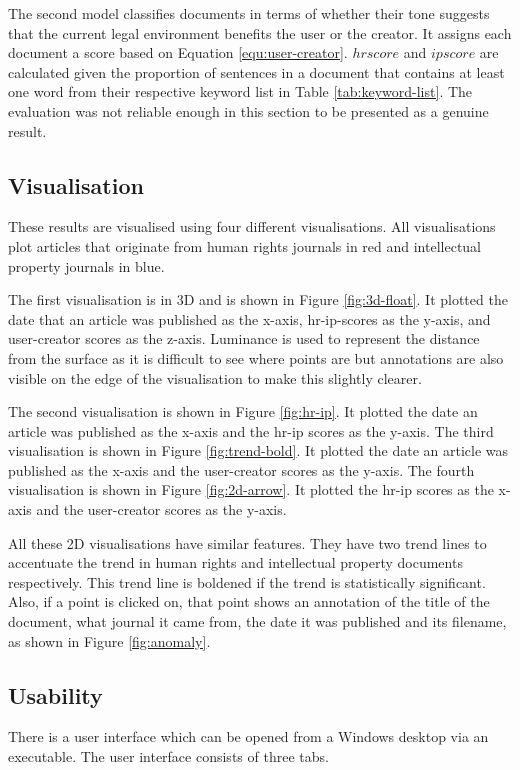 			The second model classifies documents in terms of whether their tone suggests that the current legal environment benefits the user or the creator. It assigns each document a score based on Equation \ref{equ:user-creator}. $hrscore$ and $ipscore$ are calculated given the proportion of sentences in a document that contains at least one word from their respective keyword list in Table \ref{tab:keyword-list}. The evaluation was not reliable enough in this section to be presented as a genuine result.  
		\subsection{Visualisation}
			These results are visualised using four different visualisations. All visualisations plot articles that originate from human rights journals in red and intellectual property journals in blue.  

			The first visualisation is in 3D and is shown in Figure \ref{fig:3d-float}. It plotted the date that an article was published as the x-axis, hr-ip-scores as the y-axis, and user-creator scores as the z-axis. Luminance is used to represent the distance from the surface as it is difficult to see where points are but annotations are also visible on the edge of the visualisation to make this slightly clearer. 

			The second visualisation is shown in Figure \ref{fig:hr-ip}. It plotted the date an article was published as the x-axis and the hr-ip scores as the y-axis. The third visualisation is shown in Figure \ref{fig:trend-bold}. It plotted the date an article was published as the x-axis and the user-creator scores as the y-axis. The fourth visualisation is shown in Figure \ref{fig:2d-arrow}. It plotted the hr-ip scores as the x-axis and the user-creator scores as the y-axis. 

			All these 2D visualisations have similar features. They have two trend lines to accentuate the trend in human rights and intellectual property documents respectively. This trend line is boldened if the trend is statistically significant. Also, if a point is clicked on, that point shows an annotation of the title of the document, what journal it came from, the date it was published and its filename, as shown in Figure \ref{fig:anomaly}. 
		\subsection{Usability}
			There is a user interface which can be opened from a Windows desktop via an executable. The user interface consists of three tabs.  

